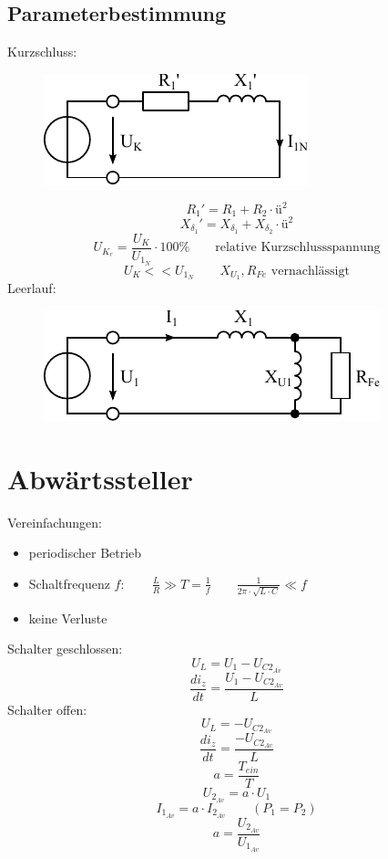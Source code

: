 \subsection{Parameterbestimmung}
Kurzschluss: 
\begin{figure}[h!]
\centering
\includegraphics[scale=\schscale]{../fig/trafo-param-short.pdf}
\label{sch:trafo-param-short}
\end{figure}
\[ R_1' = R_1 + R_2 \cdot ü^2 \]
\[ X_{\delta_1}' = X_{\delta_1} + X_{\delta_2} \cdot ü^2 \]
\[ U_{K_r} = \frac{U_K}{U_{1_N}} \cdot 100 \% 
\qquad \text{relative Kurzschlussspannung} \]
\[ U_K << U_{1_N} \qquad X_{U_1}, R_{Fe} \text{ vernachlässigt} \]
Leerlauf: 
\begin{figure}[h!]
\centering
\includegraphics[scale=\schscale]{../fig/trafo-param-open.pdf}
\label{sch:trafo-param-open}
\end{figure}

\section{Abwärtssteller}
Vereinfachungen: 
\begin{itemize}
  \item periodischer Betrieb
  \item Schaltfrequenz $f: \qquad\frac{L}{R} \gg T = \frac{1}{f} 
        \qquad \frac{1}{2 \pi \cdot \sqrt{L \cdot C}} \ll f$
  \item keine Verluste
\end{itemize}
Schalter geschlossen: 
\[ U_L = U_1 - U_{C2_{Av}} \]
\[ \frac{d i_z}{d t} = \frac{U_1 - U_{C2_{Av}}}{L} \]
Schalter offen: 
\[ U_L = - U_{C2_{Av}} \]
\[ \frac{d i_z}{d t} = \frac{- U_{C2_{Av}}}{L} \]
\[ a = \frac{T_{ein}}{T} \]
\[ U_{2_{Av}} = a \cdot U_1 \]
\[ I_{1_{Av}} = a \cdot I_{2_{Av}} \qquad (P_1 = P_2) \]
\[ a = \frac{U_{2_{Av}}}{U_{1_{Av}}} \]

